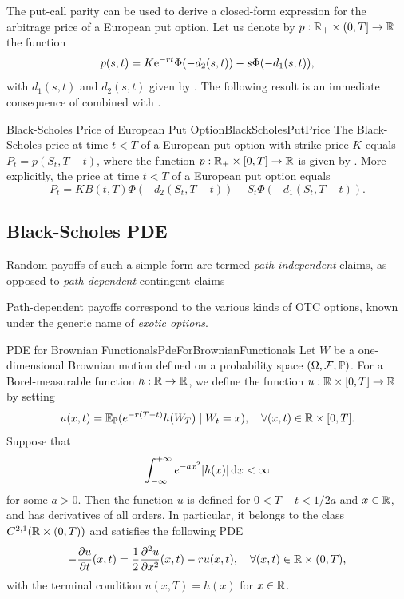 The put-call parity can be used to derive a closed-form expression for the arbitrage price of a European put option. Let us denote by \(p : \mathbb{R}_+ \times \left(0, T\right] \to \mathbb{R}\) the function
\begin{equation} \label{eq:PutOptionFunction}
	p(s,t) = K \mathrm{e}^{-rt} \Phi(-d_2(s,t)) - s \Phi(-d_1(s,t)),
\end{equation}
with \(d_1(s,t)\) and \(d_2(s,t)\) given by . The following result is an immediate consequence of  combined with .

\begin{cor}{Black-Scholes Price of European Put Option}{BlackScholesPutPrice}
	The Black-Scholes price at time \(t < T\) of a European put option with strike price \(K\) equals \(P_t = p(S_t, T - t)\), where the function \(p : \mathbb{R}_+ \times \left[0, T\right] \to \mathbb{R}\) is given by . More explicitly, the price at time \(t < T\) of a European put option equals
	\begin{equation}
		P_t = K B(t, T) \Phi(-d_2(S_t, T - t)) - S_t \Phi(-d_1(S_t, T - t)).
	\end{equation}
\end{cor}

\subsection{Black-Scholes PDE}
Random payoffs of such a simple form are termed \textit{path-independent} claims, as opposed to \textit{path-dependent} contingent claims

Path-dependent payoffs correspond to the various kinds of OTC options, known under the generic name of \textit{exotic options}.

\begin{lem}{PDE for Brownian Functionals}{PdeForBrownianFunctionals}
	Let \(W\) be a one-dimensional Brownian motion defined on a probability space \((\Omega, \mathcal{F}, \mathbb{P})\). For a Borel-measurable function \(h : \mathbb{R} \to \mathbb{R}\), we define the function \(u : \mathbb{R} \times \left[0, T\right] \to \mathbb{R}\) by setting
	\begin{equation}
		u(x, t) = \mathbb{E}_{\mathbb{P}}(e^{-r(T-t)} h(W_T) \mid W_t = x), \quad \forall (x, t) \in \mathbb{R} \times [0, T].
	\end{equation}
	Suppose that
	\begin{equation}
		\int_{-\infty}^{+\infty} e^{-ax^2} |h(x)| \, \mathrm{d} x < \infty
	\end{equation}
	for some \(a > 0\). Then the function \(u\) is defined for \(0 < T - t < 1/2a\) and \(x \in \mathbb{R}\), and has derivatives of all orders. In particular, it belongs to the class \(C^{2,1}(\mathbb{R} \times \left(0, T\right))\) and satisfies the following PDE
	\begin{equation}
		-\frac{\partial u}{\partial t}(x, t) = \frac{1}{2} \frac{\partial^2 u}{\partial x^2}(x, t) - ru(x, t), \quad \forall (x, t) \in \mathbb{R} \times (0, T),
	\end{equation}
	with the terminal condition \(u(x, T) = h(x)\) for \(x \in \mathbb{R}\).
\end{lem}
